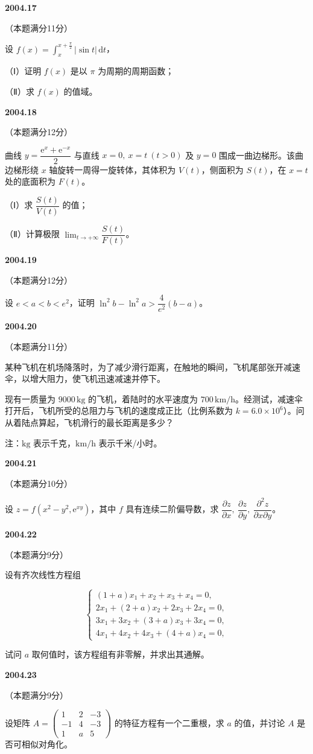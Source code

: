\documentclass[UTF8,12pt,fontset=windows]{ctexart}
\begin{document}
\vfill
\newpage
{\large\bfseries 2004.17}

（本题满分11分）

设 $f(x)=\displaystyle\int_x^{x+\frac{\pi}{2}}|\sin t|\,\mathrm{d}t$，

（Ⅰ）证明 $f(x)$ 是以 $\pi$ 为周期的周期函数；

（Ⅱ）求 $f(x)$ 的值域。

\vfill
\newpage
{\large\bfseries 2004.18}

（本题满分12分）

曲线 $y=\dfrac{\mathrm{e}^x+\mathrm{e}^{-x}}{2}$ 与直线 $x=0,\ x=t\ (t>0)$ 及 $y=0$ 围成一曲边梯形。该曲边梯形绕 $x$ 轴旋转一周得一旋转体，其体积为 $V(t)$，侧面积为 $S(t)$，在 $x=t$ 处的底面积为 $F(t)$。

（Ⅰ）求 $\dfrac{S(t)}{V(t)}$ 的值；

（Ⅱ）计算极限 $\lim_{t\to+\infty}\dfrac{S(t)}{F(t)}$。

\vfill
\newpage
{\large\bfseries 2004.19}

（本题满分12分）

设 $e<a<b<e^2$，证明 $\ln^2b-\ln^2a>\dfrac{4}{e^2}(b-a)$。

\vfill
\newpage
{\large\bfseries 2004.20}

（本题满分11分）

某种飞机在机场降落时，为了减少滑行距离，在触地的瞬间，飞机尾部张开减速伞，以增大阻力，使飞机迅速减速并停下。

现有一质量为 $9000\,\mathrm{kg}$ 的飞机，着陆时的水平速度为 $700\,\mathrm{km/h}$。经测试，减速伞打开后，飞机所受的总阻力与飞机的速度成正比（比例系数为 $k=6.0\times10^6$）。问从着陆点算起，飞机滑行的最长距离是多少？

注：$\mathrm{kg}$ 表示千克，$\mathrm{km/h}$ 表示千米/小时。

\vfill
\newpage
{\large\bfseries 2004.21}

（本题满分10分）

设 $z=f(x^2-y^2,\mathrm{e}^{xy})$，其中 $f$ 具有连续二阶偏导数，求 $\dfrac{\partial z}{\partial x},\ \dfrac{\partial z}{\partial y},\ \dfrac{\partial^2z}{\partial x\partial y}$。

\vfill
\newpage
{\large\bfseries 2004.22}

（本题满分9分）

设有齐次线性方程组

$$\begin{cases}(1+a)x_1+x_2+x_3+x_4=0,\\ 2x_1+(2+a)x_2+2x_3+2x_4=0,\\ 3x_1+3x_2+(3+a)x_3+3x_4=0,\\ 4x_1+4x_2+4x_3+(4+a)x_4=0,\end{cases}$$

试问 $a$ 取何值时，该方程组有非零解，并求出其通解。

\vfill
\newpage
{\large\bfseries 2004.23}

（本题满分9分）

设矩阵 $A=\begin{pmatrix}1&2&-3\\-1&4&-3\\1&a&5\end{pmatrix}$ 的特征方程有一个二重根，求 $a$ 的值，并讨论 $A$ 是否可相似对角化。

\vfill
\end{document}
